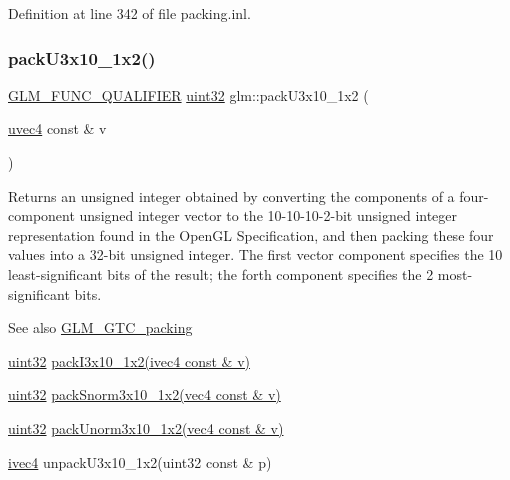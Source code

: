 Definition at line 342 of file packing.\+inl.

\mbox{\label{group__gtc__packing_gaf656d8862628f96b20de7a36eaa1fe56}} 
\subsubsection{\texorpdfstring{pack\+U3x10\+\_\+1x2()}{packU3x10\_1x2()}}
{\footnotesize\ttfamily \hyperlink{setup_8hpp_a33fdea6f91c5f834105f7415e2a64407}{G\+L\+M\+\_\+\+F\+U\+N\+C\+\_\+\+Q\+U\+A\+L\+I\+F\+I\+ER} \hyperlink{group__gtc__type__precision_ga202b6a53c105fcb7e531f9b443518451}{uint32} glm\+::pack\+U3x10\+\_\+1x2 (\begin{DoxyParamCaption}\item[{\hyperlink{group__core__types_ga1c426d19627b32b14f0089f7f4ba7b1d}{uvec4} const \&}]{v }\end{DoxyParamCaption})}

Returns an unsigned integer obtained by converting the components of a four-\/component unsigned integer vector to the 10-\/10-\/10-\/2-\/bit unsigned integer representation found in the Open\+GL Specification, and then packing these four values into a 32-\/bit unsigned integer. The first vector component specifies the 10 least-\/significant bits of the result; the forth component specifies the 2 most-\/significant bits.

\begin{DoxySeeAlso}{See also}
\hyperlink{group__gtc__packing}{G\+L\+M\+\_\+\+G\+T\+C\+\_\+packing} 

\hyperlink{group__gtc__type__precision_ga202b6a53c105fcb7e531f9b443518451}{uint32} \hyperlink{group__gtc__packing_ga032e18fa5bc5b8f3897104aeb2f1e195}{pack\+I3x10\+\_\+1x2(ivec4 const \& v)} 

\hyperlink{group__gtc__type__precision_ga202b6a53c105fcb7e531f9b443518451}{uint32} \hyperlink{group__gtc__packing_ga0d4157cec37c0312216a7be1cc92df54}{pack\+Snorm3x10\+\_\+1x2(vec4 const \& v)} 

\hyperlink{group__gtc__type__precision_ga202b6a53c105fcb7e531f9b443518451}{uint32} \hyperlink{group__gtc__packing_ga2cf2d11b40bd48639110456fd74c2e33}{pack\+Unorm3x10\+\_\+1x2(vec4 const \& v)} 

\hyperlink{group__core__types_gaa4560ddc50320ea8f8a70d5c9c249fea}{ivec4} unpack\+U3x10\+\_\+1x2(uint32 const \& p) 
\end{DoxySeeAlso}


